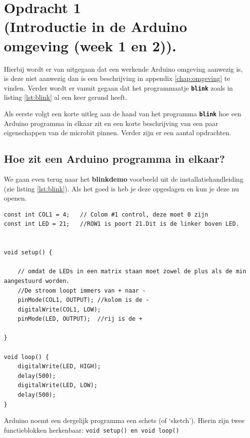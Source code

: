 \chapter{Opdracht 1\\  \small (Introductie in de Arduino omgeving (week 1 en 2)).}
\label{chap:intr}

Hierbij wordt er van uitgegaan dat een werkende Arduino omgeving aanwezig is, is deze niet aanwezig dan is een beschrijving in appendix \ref{chap:omgeving} te vinden. Verder wordt er vanuit gegaan dat het programmaatje \texttt{\textbf{blink}} zoals in listing \ref{lst:blink} al een keer gerund heeft.


Als eerste volgt een korte uitleg aan de hand van het programma \texttt{\textbf{blink}} hoe een Arduino programma in elkaar zit en een korte beschrijving van een paar eigenschappen van de microbit pinnen. Verder zijn er een aantal opdrachten.


\section{ Hoe zit een Arduino programma in elkaar?}\label{sec:blink}

We gaan even terug naar het \textbf{blinkdemo} voorbeeld uit de installatiehandleiding (zie listing \ref{lst:blink}).  Als het goed is heb je deze opgeslagen en kun je deze nu openen.

	


\begin{lstlisting}[caption= Het programma blinkdemo,label={lst:blink},firstnumber=1]		
const int COL1 = 4;   // Colom #1 control, deze moet 0 zijn
const int LED = 21;   //ROW1 is poort 21.Dit is de linker boven LED.


void setup() {
	
	// omdat de LEDs in een matrix staan moet zowel de plus als de min aangestuurd worden.
	//De stroom loopt immers van + naar -
	pinMode(COL1, OUTPUT); //kolom is de -
	digitalWrite(COL1, LOW);
	pinMode(LED, OUTPUT);  //rij is de +
	
}

void loop() {
	digitalWrite(LED, HIGH);
	delay(500);
	digitalWrite(LED, LOW);
	delay(500);
}
\end{lstlisting}

Arduino noemt een dergelijk programma een schets (of ‘sketch’). 
Hierin zijn twee functieblokken herkenbaar: \texttt{{\textcolor{arduinoBlue}{void}} \textcolor{arduinoGreen}{setup}(){} en  \textcolor{arduinoBlue}{void} \textcolor{arduinoGreen}{loop}(){}}

